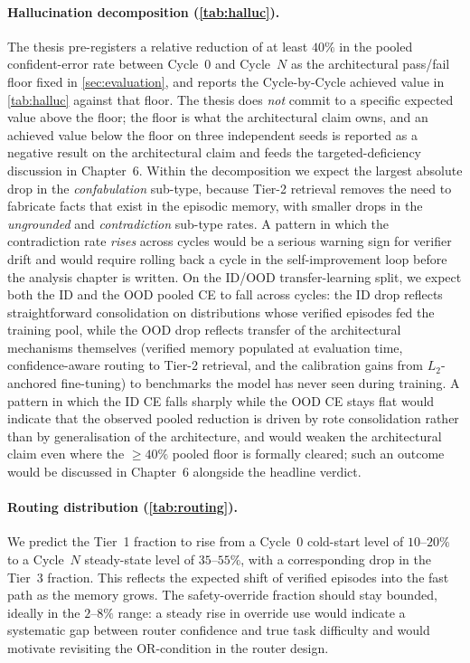 \paragraph{Hallucination decomposition (\cref{tab:halluc}).}
The thesis pre-registers a relative reduction of at least $40\%$
in the pooled confident-error rate between Cycle~$0$ and Cycle~$N$
as the architectural pass/fail floor fixed in
\cref{sec:evaluation}, and reports the Cycle-by-Cycle achieved
value in \cref{tab:halluc} against that floor. The thesis does
\emph{not} commit to a specific expected value above the floor;
the floor is what the architectural claim owns, and an achieved
value below the floor on three independent seeds is reported as a
negative result on the architectural claim and feeds the
targeted-deficiency discussion in Chapter~6. Within the
decomposition we expect the largest absolute drop in the
\emph{confabulation} sub-type, because Tier-2 retrieval removes
the need to fabricate facts that exist in the episodic memory,
with smaller drops in the \emph{ungrounded} and
\emph{contradiction} sub-type rates. A pattern in which the
contradiction rate \emph{rises} across cycles would be a serious
warning sign for verifier drift and would require rolling back a
cycle in the self-improvement loop before the analysis chapter is
written.
On the ID/OOD transfer-learning split, we expect both the ID and
the OOD pooled CE to fall across cycles: the ID drop reflects
straightforward consolidation on distributions whose verified
episodes fed the training pool, while the OOD drop reflects
transfer of the architectural mechanisms themselves (verified
memory populated at evaluation time, confidence-aware routing to
Tier-2 retrieval, and the calibration gains from $L_2$-anchored
fine-tuning) to benchmarks the model has never seen during
training. A pattern in which the ID CE falls sharply while the
OOD CE stays flat would indicate that the observed pooled
reduction is driven by rote consolidation rather than by
generalisation of the architecture, and would weaken the
architectural claim even where the $\geq 40\%$ pooled floor is
formally cleared; such an outcome would be discussed in
Chapter~6 alongside the headline verdict.

\paragraph{Routing distribution (\cref{tab:routing}).}
We predict the Tier~1 fraction to rise from a Cycle~$0$ cold-start
level of $10$--$20\%$ to a Cycle~$N$ steady-state level of
$35$--$55\%$, with a corresponding drop in the Tier~3 fraction. This
reflects the expected shift of verified episodes into the fast path as
the memory grows. The safety-override fraction should stay bounded,
ideally in the $2$--$8\%$ range: a steady rise in override use would
indicate a systematic gap between router confidence and true task
difficulty and would motivate revisiting the OR-condition in the
router design.


